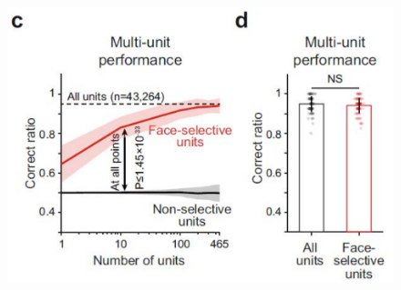 \documentclass[final,3p,times,twocolumn]{elsarticle}
\begin{document}
\begin{figure}[htbp]
	\centering
	
	\subfigure%
	{
		\begin{minipage}[t]{1.0\linewidth}
			\centering
			\includegraphics[width=1.0\textwidth]{figs/fig_3_c_d.pdf}
		\end{minipage}%
	}%
	

\end{figure}
\end{document}
